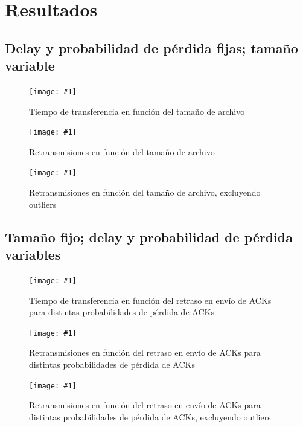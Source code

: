 \documentclass[a4paper, 10pt, twoside]{article}
\newcommand{\grafico}[3]{
  \begin{figure}[H]
    \texttt{[image: \#1]}
    \caption{#2}
    \label{#3}
  \end{figure}
}
\begin{document}


\section{Resultados}
\label{sec:resultados}

\subsection{Delay y probabilidad de pérdida fijas; tamaño variable}

\grafico{time_vs_size}
        {Tiempo de transferencia en función del tamaño de archivo}
        {plot:time_vs_size}

\grafico{retransmissions_vs_size}
        {Retransmisiones en función del tamaño de archivo}
        {plot:retransmissions_vs_size}

\grafico{retransmissions_vs_size_wo_outliers}
        {Retransmisiones en función del tamaño de archivo, excluyendo outliers}
        {plot:retransmissions_vs_size_wo_outliers}


\subsection{Tamaño fijo; delay y probabilidad de pérdida variables}

\grafico{time_vs_delay_and_loss_probability}
        {Tiempo de transferencia en función del retraso en envío de ACKs para distintas probabilidades de pérdida de ACKs}
        {plot:time_vs_delay_and_loss_probability}

\grafico{retransmissions_vs_delay_and_loss_probability}
        {Retransmisiones en función del retraso en envío de ACKs para distintas probabilidades de pérdida de ACKs}
        {plot:retransmissions_vs_delay_and_loss_probability}

\grafico{retransmissions_vs_delay_and_loss_probability_wo_outliers}
        {Retransmisiones en función del retraso en envío de ACKs para distintas probabilidades de pérdida de ACKs, excluyendo outliers}
        {plot:retransmissions_vs_delay_and_loss_probability_wo_outliers}


\end{document}
